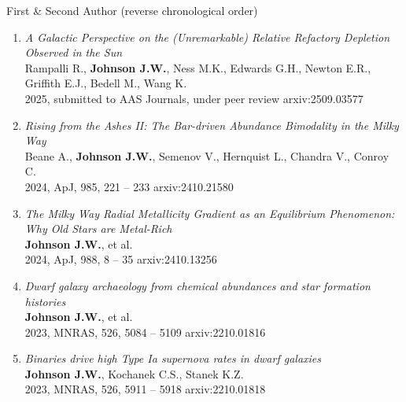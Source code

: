 \documentclass[cv.tex]{subfiles}
\begin{document}
%
\noindent
{\color{themecolor} \large First \& Second Author}
(reverse chronological order)
\par\noindent
\begin{enumerate}

	\vspace{-3mm}

	\item \textit{A Galactic Perspective on the (Unremarkable) Relative
	Refactory Depletion Observed in the Sun}
	\\
	Rampalli R., \textbf{Johnson J.W.}, Ness M.K., Edwards G.H., Newton E.R.,
	Griffith E.J., Bedell M., Wang K.
	\\
	2025, submitted to AAS Journals, under peer review \hfill arxiv:2509.03577

	\item \textit{Rising from the Ashes II: The Bar-driven Abundance Bimodality
	in the Milky Way}
	\\
	Beane A., \textbf{Johnson J.W.}, Semenov V., Hernquist L., Chandra V.,
	Conroy C.
	\\
	2024, ApJ, 985, 221 -- 233 \hfill arxiv:2410.21580

	\item \textit{The Milky Way Radial Metallicity Gradient as an Equilibrium
	Phenomenon: Why Old Stars are Metal-Rich}
	\\
	\textbf{Johnson J.W.}, et al.
	\\
	2024, ApJ, 988, 8 -- 35 \hfill arxiv:2410.13256

	\item \textit{Dwarf galaxy archaeology from chemical abundances and star
	formation histories}
	\\
	\textbf{Johnson J.W.}, et al.
	\\
	2023, MNRAS, 526, 5084 -- 5109 \hfill arxiv:2210.01816

	\item \textit{Binaries drive high Type Ia supernova rates in dwarf
	galaxies}
	\\
	\textbf{Johnson J.W.}, Kochanek C.S., Stanek K.Z.
	\\
	2023, MNRAS, 526, 5911 -- 5918 \hfill arxiv:2210.01818


\end{enumerate}
\end{document}
